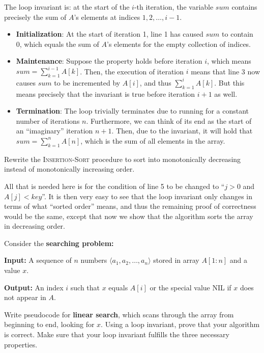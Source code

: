 \begin{solution}

    The loop invariant is: at the start of the $i$-th iteration, the variable $sum$ contains precisely the sum of $A$'s elements at indices $1, 2, \ldots, i - 1$.
    \begin{itemize}
        \item \textbf{Initialization}: At the start of iteration 1, line 1 has caused $sum$ to contain 0, which equals the sum of $A$'s elements for the empty collection of indices.
        \item \textbf{Maintenance}: Suppose the property holds before iteration $i$, which means $sum = \sum_{k=1}^{i - 1} A[k]$.
        Then, the execution of iteration $i$ means that line 3 now causes $sum$ to be incremented by $A[i]$, and thus $\sum_{k=1}^{i} A[k]$.
        But this means precisely that the invariant is true before iteration $i + 1$ as well.
        \item \textbf{Termination}: The loop trivially terminates due to running for a constant number of iterations $n$.
        Furthermore, we can think of its end as the start of an ``imaginary'' iteration $n + 1$.
        Then, due to the invariant, it will hold that $sum = \sum_{k=1}^{n} A[n]$, which is the sum of all elements in the array.
    \end{itemize}
\end{solution}

\begin{exercise}{3}
    Rewrite the I\textsc{nsertion-}S\textsc{ort} procedure to sort into monotonically decreasing instead of monotonically increasing order.
\end{exercise}

\begin{solution}
    
    All that is needed here is for the condition of line 5 to be changed to ``$j > 0$ and $A[j] < key$''.
    It is then very easy to see that the loop invariant only changes in terms of what ``sorted order'' means, and thus the remaining proof of correctness would be the same, except that now we show that the algorithm sorts the array in decreasing order.
\end{solution}

\begin{exercise}{4}
    Consider the \textbf{searching problem:}

    \textbf{Input:} A sequence of $n$ numbers $\langle a_1, a_2, \ldots, a_n \rangle$ stored in array $A[1:n]$ and a value $x$.

    \textbf{Output:} An index $i$ such that $x$ equals $A[i]$ or the special value NIL if $x$ does not appear in $A$.

    Write pseudocode for \textbf{linear search}, which scans through the array from beginning to end, looking for $x$.
    Using a loop invariant, prove that your algorithm is correct.
    Make sure that your loop invariant fulfills the three necessary properties.
\end{exercise}

